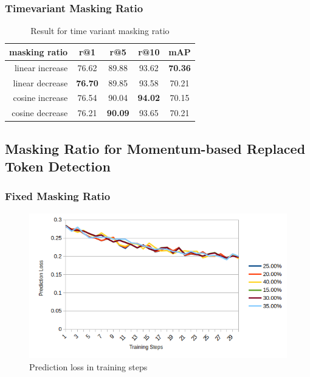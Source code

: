 \subsubsection{Timevariant Masking Ratio}
\begin{table}[htbp]
  \centering
  \caption{Result for time variant masking ratio}
  \label{tb:time_variant_mlm}
  \begin{tabular}{rcccc}
    \centering
    masking ratio & r@1 & r@5 & r@10 & mAP\\ \hline
    linear increase & 76.62 & 89.88 & 93.62 & \textbf{70.36} \\
    linear decrease & \textbf{76.70} & 89.85 & 93.58 & 70.21 \\
    cosine increase & 76.54 & 90.04 & \textbf{94.02} & 70.15 \\
    cosine decrease & 76.21 & \textbf{90.09} & 93.65 & 70.21 \\
  \end{tabular}
\end{table}


\subsection{Masking Ratio for Momentum-based Replaced Token Detection}

\subsubsection{Fixed Masking Ratio}
\begin{figure}
    \includegraphics[width=\linewidth]{img/mrtd_prd_loss.png}
    \caption{Prediction loss in training steps}
    \label{img:mrtd_prd_loss}
\end{figure}


